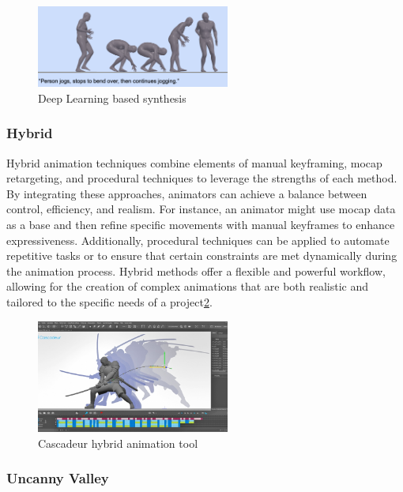 \begin{figure}
  \centering \includegraphics[width = 2.5in]{images/background_work/deep_learning_synthesis.png}
  \caption{Deep Learning based synthesis\cite{guo2022generating}}
  \label{fig:deep_learning_synthesis}
\end{figure}

\subsubsection{Hybrid}

Hybrid animation techniques combine elements of manual keyframing, mocap retargeting, and procedural techniques to leverage the strengths of each method. By integrating these approaches, animators can achieve a balance between control, efficiency, and realism. For instance, an animator might use mocap data as a base and then refine specific movements with manual keyframes to enhance expressiveness. Additionally, procedural techniques can be applied to automate repetitive tasks or to ensure that certain constraints are met dynamically during the animation process. Hybrid methods offer a flexible and powerful workflow, allowing for the creation of complex animations that are both realistic and tailored to the specific needs of a project\ref{fig:cascadeur}.

\begin{figure}
  \centering \includegraphics[width = 2.5in]{images/background_work/cascadeur.png}
  \caption{Cascadeur hybrid animation tool}
  \label{fig:cascadeur}
\end{figure}

\subsubsection{Uncanny Valley}

